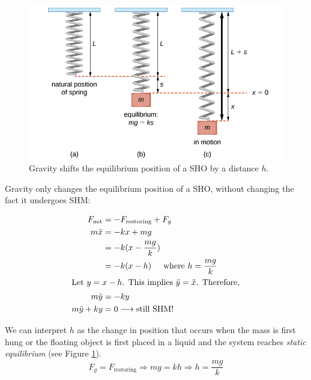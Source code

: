 \documentclass[11pt,letterpaper,titlepage,oneside]{book}
\newcommand{\htab}{\hspace{0.5cm}}
\newcommand{\where}{\htab\text{where }}
\begin{document}
\begin{figure}[h]
	\centering
	\includegraphics[scale=0.5]{phys232/Ch3-g-new-eqm} \caption{Gravity shifts the equilibrium position of a SHO by a distance $h$.}\label{fig:ch3-g-new-eqm-pos}
\end{figure}

Gravity only changes the equilibrium position of a SHO, without changing the fact it undergoes SHM:

\begin{align*}
	F_\text{net} &= -F_\text{restoring} + F_g \\
	m\ddot{x} &= -kx + mg \\
	& = -k(x - \frac{mg}{k}) \\
	& = -k(x - h) \where h=\frac{mg}{k}\\
	\intertext{Let $y=x-h$. This implies $\ddot{y} = \ddot{x}$. Therefore,}
	m\ddot{y} &= -ky \\
	m\ddot{y} + ky &= 0  \longrightarrow \text{still SHM!}
\end{align*}

We can interpret $h$ as the change in position that occurs when the mass is first hung or the floating object is first placed in a liquid and the system reaches \emph{static equilibrium} (see Figure \ref{fig:ch3-g-new-eqm-pos}).
\[ F_g = F_\text{restoring}\Longrightarrow mg = kh \Longrightarrow h = \frac{mg}{k} \]
\end{document}
